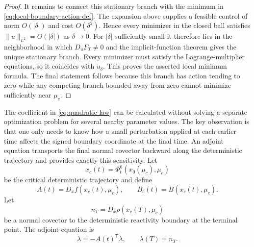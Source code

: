 \documentclass[11pt]{article}
\theoremstyle{definition}
\theoremstyle{remark}
\newcommand{\cT}{\mathsf{T}}
\begin{document}
\begin{proof}
It remains to connect this stationary branch with the minimum in \eqref{eq:local-boundary-action-def}.  The expansion above supplies a feasible control of norm $O(|\delta|)$ and cost $O(\delta^2)$.  Hence every minimizer in the closed ball satisfies $\|u\|_{L^2}=O(|\delta|)$ as $\delta\to0$.  For $|\delta|$ sufficiently small it therefore lies in the neighborhood in which $D_uF_T\ne0$ and the implicit-function theorem gives the unique stationary branch.  Every minimizer must satisfy the Lagrange-multiplier equations, so it coincides with $u_\delta$.  This proves the asserted local minimum formula.  The final statement follows because this branch has action tending to zero while any competing branch bounded away from zero cannot minimize sufficiently near $\mu_c$.
\end{proof}

The coefficient in \eqref{eq:quadratic-law} can be calculated without solving a separate optimization problem for several nearby parameter values.  The key observation is that one only needs to know how a small perturbation applied at each earlier time affects the signed boundary coordinate at the final time.  An adjoint equation transports the final normal covector backward along the deterministic trajectory and provides exactly this sensitivity.  Let
\begin{equation}
x_c(t)=\Phi_t^0(x_0(\mu_c),\mu_c)
\end{equation}
be the critical deterministic trajectory and define
\begin{equation}
A(t)=D_xf(x_c(t),\mu_c),
\qquad
B_c(t)=B(x_c(t),\mu_c).
\end{equation}
Let
\begin{equation}
n_T=D_x\rho(x_c(T),\mu_c)
\end{equation}
be a normal covector to the deterministic reactivity boundary at the terminal point.  The adjoint equation is
\begin{equation}
\dot\lambda=-A(t)^{\cT}\lambda,
\qquad
\lambda(T)=n_T.
\label{eq:adjoint-equation}
\end{equation}
\end{document}
